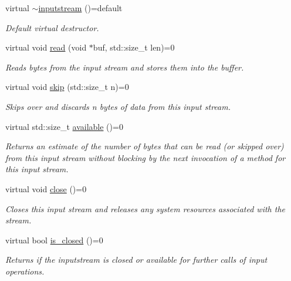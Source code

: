 \begin{DoxyCompactItemize}
\item 
virtual \hyperlink{structdevfix_1_1base_1_1io_1_1inputstream_a1da9f4c189be9ee315caabd2b4fdc125}{$\sim$inputstream} ()=default
\begin{DoxyCompactList}\small\item\em Default virtual destructor. \end{DoxyCompactList}\item 
virtual void \hyperlink{structdevfix_1_1base_1_1io_1_1inputstream_a17e1a21881ae263650ebdaafaee2e71a}{read} (void $\ast$buf, std\+::size\+\_\+t len)=0
\begin{DoxyCompactList}\small\item\em Reads bytes from the input stream and stores them into the buffer. \end{DoxyCompactList}\item 
virtual void \hyperlink{structdevfix_1_1base_1_1io_1_1inputstream_a1868a733fd646b29daae6874e07e4e03}{skip} (std\+::size\+\_\+t n)=0
\begin{DoxyCompactList}\small\item\em Skips over and discards n bytes of data from this input stream. \end{DoxyCompactList}\item 
virtual std\+::size\+\_\+t \hyperlink{structdevfix_1_1base_1_1io_1_1inputstream_ace04813af676b6c81fa452eb4d81a796}{available} ()=0
\begin{DoxyCompactList}\small\item\em Returns an estimate of the number of bytes that can be read (or skipped over) from this input stream without blocking by the next invocation of a method for this input stream. \end{DoxyCompactList}\item 
virtual void \hyperlink{structdevfix_1_1base_1_1io_1_1inputstream_a1188eff97757eb9625be91dfeca17af7}{close} ()=0
\begin{DoxyCompactList}\small\item\em Closes this input stream and releases any system resources associated with the stream. \end{DoxyCompactList}\item 
virtual bool \hyperlink{structdevfix_1_1base_1_1io_1_1inputstream_a9da6b400424ff476ed0479193c219fa9}{is\+\_\+closed} ()=0
\begin{DoxyCompactList}\small\item\em Returns if the {\itshape inputstream} is closed or available for further calls of input operations. \end{DoxyCompactList}\end{DoxyCompactItemize}


